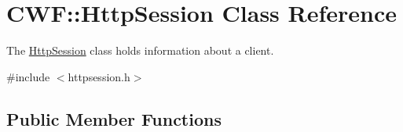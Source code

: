 \hypertarget{class_c_w_f_1_1_http_session}{\section{C\+W\+F\+:\+:Http\+Session Class Reference}
\label{class_c_w_f_1_1_http_session}
}


The \hyperlink{class_c_w_f_1_1_http_session}{Http\+Session} class holds information about a client.  




{\ttfamily \#include $<$httpsession.\+h$>$}

\subsection*{Public Member Functions}
